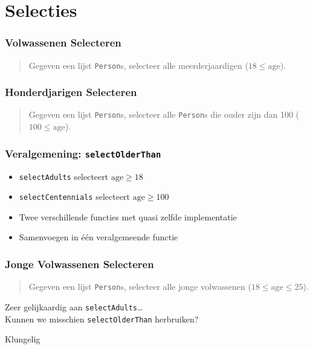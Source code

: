 \section{Selecties}

\frame{\tableofcontents[currentsection]}

\begin{frame}
  \frametitle{Volwassenen Selecteren}
  \begin{quote}
    Gegeven een lijst \texttt{Person}s, selecteer
    alle meerderjaardigen ($18 \leq \mathrm{age}$).
  \end{quote}
\end{frame}

\begin{frame}
  \frametitle{Honderdjarigen Selecteren}
  \begin{quote}
    Gegeven een lijst \texttt{Person}s, selecteer
    alle \texttt{Person}s die ouder zijn dan 100 ($100 \leq \mathrm{age}$).
  \end{quote}
\end{frame}

\begin{frame}
  \frametitle{Veralgemening: \texttt{selectOlderThan}}
  \begin{itemize}
    \item \texttt{selectAdults} selecteert $\mathrm{age} \geq 18$
    \item \texttt{selectCentennials} selecteert $\mathrm{age} \geq 100$
    \item Twee verschillende functies met quasi zelfde implementatie
    \item Samenvoegen in \'e\'en veralgemeende functie
  \end{itemize}
\end{frame}

\begin{frame}
  \frametitle{Jonge Volwassenen Selecteren}
  \begin{quote}
    Gegeven een lijst \texttt{Person}s, selecteer
    alle jonge volwassenen ($18 \leq \mathrm{age} \leq 25$).
  \end{quote}
  \vskip5mm
  \begin{overprint}

  \end{overprint}
  \vskip5mm
  \begin{overprint}
    \begin{center}
      Zeer gelijkaardig aan \texttt{selectAdults}\dots \\
      Kunnen we misschien \texttt{selectOlderThan} herbruiken?
    \end{center}

    \begin{center}
      Klungelig
    \end{center}
  \end{overprint}
\end{frame}

